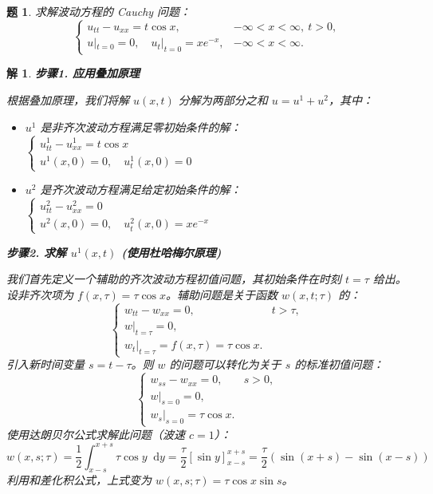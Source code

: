 \documentclass[12pt,a4paper]{article}
\newcommand{\diff}{\mathop{}\!\mathrm{d}}  %
\newtheorem{problem}{题}
\newtheorem*{solution}{解}
\begin{document}
		\hrulefill
\begin{problem}
	求解波动方程的 Cauchy 问题：
	\[
	\begin{cases}
		u_{tt} - u_{xx} = t \cos x, & -\infty < x < \infty, \ t > 0, \\
		u|_{t=0} = 0, \quad u_t|_{t=0} = xe^{-x}, & -\infty < x < \infty.
	\end{cases}
	\]
\end{problem}
\hrulefill
\begin{solution}
	\textbf{步骤1. 应用叠加原理}
	
	\noindent
	根据叠加原理，我们将解 $u(x,t)$ 分解为两部分之和 $u = u^1 + u^2$，其中：
	\begin{itemize}
		\item $u^1$ 是非齐次波动方程满足零初始条件的解：
		$
		\begin{cases}
			u^1_{tt} - u^1_{xx} = t\cos x \\
			u^1(x,0)=0, \quad u^1_{t}(x,0)=0
		\end{cases}
		$
		\item $u^2$ 是齐次波动方程满足给定初始条件的解：
		$
		\begin{cases}
			u^2_{tt} - u^2_{xx} = 0 \\
			u^2(x,0)=0, \quad u^2_{t}(x,0)=xe^{-x}
		\end{cases}
		$
	\end{itemize}
	
	\hrulefill
	
	\textbf{步骤2. 求解 $u^1(x,t)$ (使用杜哈梅尔原理)}
	
	\noindent
	我们首先定义一个辅助的齐次波动方程初值问题，其初始条件在时刻 $t=\tau$ 给出。设非齐次项为 $f(x,\tau) = \tau \cos x$。辅助问题是关于函数 $w(x, t; \tau)$ 的：
	\[
	\begin{cases}
		w_{tt} - w_{xx} = 0, & t > \tau, \\
		w|_{t=\tau} = 0, \\
		w_t|_{t=\tau} = f(x,\tau) = \tau \cos x.
	\end{cases}
	\]
	引入新时间变量 $s = t-\tau$。则 $w$ 的问题可以转化为关于 $s$ 的标准初值问题：
	\[
	\begin{cases}
		w_{ss} - w_{xx} = 0, & s > 0, \\
		w|_{s=0} = 0, \\
		w_s|_{s=0} = \tau \cos x.
	\end{cases}
	\]
	使用达朗贝尔公式求解此问题（波速 $c=1$）：
	\[
	w(x,s;\tau) = \frac{1}{2} \int_{x-s}^{x+s} \tau \cos y \diff y = \frac{\tau}{2}[\sin y]_{x-s}^{x+s} = \frac{\tau}{2}(\sin(x+s) - \sin(x-s))
	\]
	利用和差化积公式，上式变为 $w(x,s;\tau) = \tau \cos x \sin s$。
	

\end{solution}
\end{document}
